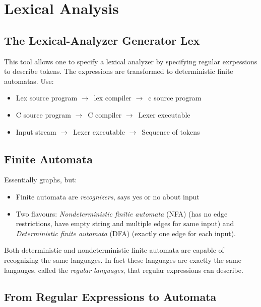 \documentclass{article}
\newcommand{\ta}{$\to$~}
\begin{document}


\section{Lexical Analysis} %
\label{sec:Lexical Analysis}

\subsection{The Lexical-Analyzer Generator Lex} %
\label{sub:The Lexical-Analyzer Generator Lex}
This tool allows one to specify a lexical analyzer by specifying regular exrpessions to describe tokens. The expressions are transformed to deterministic finite automatas. Use:
\begin{itemize}
	\item Lex source program \ta lex compiler \ta c source program
	\item C source program \ta C compiler \ta Lexer executable
	\item Input stream \ta Lexer executable \ta Sequence of tokens
\end{itemize}


\subsection{Finite Automata} %
\label{sub:Finite Automata}
Essentially graphs, but:
\begin{itemize}
	\item Finite automata are \emph{recognizers}, says yes or no about input
	\item Two flavours: \emph{Nondeterministic finitie automata} (NFA) (has no edge restrictions, have empty string and multiple edges for same input) and \emph{Deterministic finite automata} (DFA) (exactly one edge for each input).
\end{itemize}
Both deterministic and nondeterministic finite automata are capable of recognizing the same languages. In fact these languages are exactly the same langauges, called the \emph{regular languages}, that regular expressions can describe.

\subsection{From Regular Expressions to Automata} %
\label{sub:From Regular Expressions to Automata}
\end{document}
